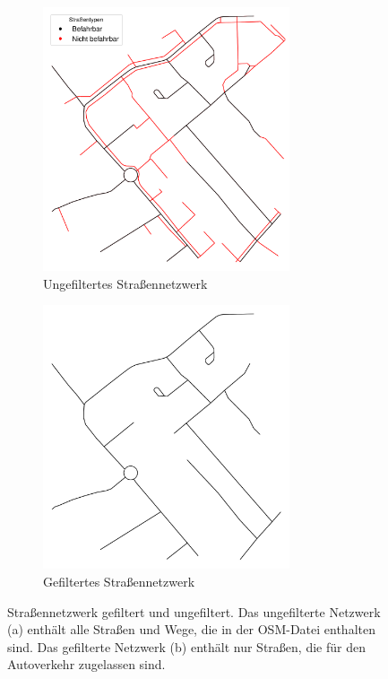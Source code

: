 \begin{figure}[h]
    \centering
    \begin{subfigure}[b]{0.45\textwidth}
        \centering
        \includegraphics[width=0.8\textwidth]{figures/roads_unfiltered.png}
        \caption{Ungefiltertes Straßennetzwerk}
    \end{subfigure}
    \begin{subfigure}[b]{0.45\textwidth}
        \centering
        \includegraphics[width=0.8\textwidth]{figures/roads_filtered.png}
        \caption{Gefiltertes Straßennetzwerk}
    \end{subfigure}
    \caption[Straßennetzwerk gefiltert und ungefiltert]{Straßennetzwerk gefiltert und ungefiltert.
        Das ungefilterte Netzwerk (a) enthält alle Straßen und Wege, die in der \ac{OSM}-Datei enthalten sind.
        Das gefilterte Netzwerk (b) enthält nur Straßen, die für den Autoverkehr zugelassen sind.}
    \label{fig:osm_filtered}
\end{figure}


